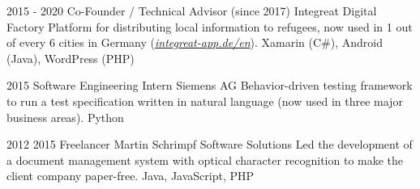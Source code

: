 {\block%
{%
2015 %
- 2020
}{%
}{%
Co-Founder / Technical Advisor (since 2017)
}{%
Integreat Digital Factory
}{%
Platform for distributing local information to refugees, now used in 1 out of every 6 cities in Germany (\href{https://integreat-app.de/en/}{\textit{integreat-app.de/en}}).
}{%
Xamarin (C\#), Android (Java), WordPress (PHP)
}

\block%
{%
2015%
}{%
}{%
Software Engineering Intern
}{%
Siemens AG
}{%
Behavior-driven testing framework to run a test specification written in natural language (now used in three major business areas).
}{%
Python
}

\block%
{%
2012 %
}{%
2015%
}{%
Freelancer
}{%
Martin Schrimpf Software Solutions
}{%
Led the development of a document %
management system with optical character recognition to make the client company paper-free.
}{%
Java, JavaScript, PHP
}

}


